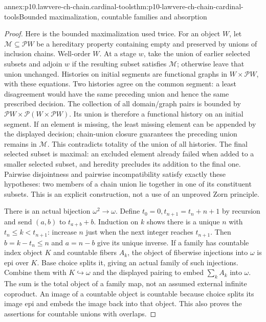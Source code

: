 \begin{annexitem}{annex:p10.lawvere-ch-chain.cardinal-tools}{thm:p10-lawvere-ch-chain-cardinal-tools}{Bounded maximalization, countable families and absorption}
\begin{proof}
Here is the bounded maximalization used twice. For an object \(W\),
let \(\mathcal M\subseteq\mathcal P W\) be a hereditary property containing
empty and preserved by unions of inclusion chains. Well-order \(W\).
At a stage \(w\), take the union of earlier selected subsets and adjoin
\(w\) if the resulting subset satisfies \(\mathcal M\); otherwise leave
that union unchanged. Histories on initial segments are functional graphs
in \(W\times\mathcal P W\), with these equations. Two histories agree
on the common segment: a least disagreement would have the same preceding
union and hence the same prescribed decision. The collection of all
domain/graph pairs is bounded by
\(\mathcal P W\times\mathcal P(W\times\mathcal P W)\).
Its union is therefore a functional history on an initial segment.
If an element is missing, the least missing element can be appended by
the displayed decision; chain-union closure guarantees the preceding
union remains in \(\mathcal M\). This contradicts totality of the union
of all histories. The final selected subset is maximal: an excluded
element already failed when added to a smaller selected subset, and
heredity precludes its addition to the final one. Pairwise disjointness
and pairwise incompatibility satisfy exactly these hypotheses: two
members of a chain union lie together in one of its constituent subsets.
This is an explicit construction, not a use of an unproved Zorn principle.

There is an actual bijection \(\omega^2\to\omega\).
Define \(t_0=0,t_{n+1}=t_n+n+1\) by recursion and send
\((a,b)\) to \(t_{a+b}+b\). Induction on \(k\) shows there is a unique
\(n\) with \(t_n\le k<t_{n+1}\): increase \(n\) just when the next
integer reaches \(t_{n+1}\). Then \(b=k-t_n\le n\) and \(a=n-b\)
give its unique inverse. If a family has countable index object \(K\)
and countable fibers \(A_k\), the object of fiberwise injections into
\(\omega\) is epi over \(K\). Base choice splits it, giving an actual
family of such injections. Combine them with \(K\hookrightarrow\omega\)
and the displayed pairing to embed \(\sum_k A_k\) into \(\omega\).
The sum is the total object of a family map, not an assumed external
infinite coproduct. An image of a countable object is countable because
choice splits its image epi and embeds the image back into that object.
This also proves the assertions for countable unions with overlaps.


\end{proof}
\end{annexitem}
